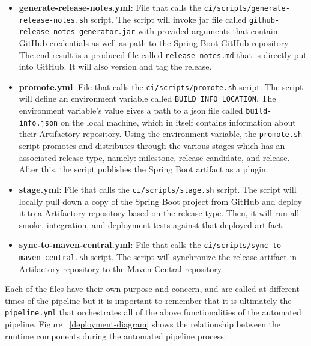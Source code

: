 \begin{itemize}
\item \textbf{generate-release-notes.yml}: File that calls the \texttt{ci/scripts/generate-release-notes.sh} script. The script will invoke jar file called \texttt{github-release-notes-generator.jar} with provided arguments that contain GitHub credentials as well as path to the Spring Boot GitHub repository. The end result is a produced file called \texttt{release-notes.md} that is directly put into GitHub. It will also version and tag the release.
\item \textbf{promote.yml}: File that calls the \texttt{ci/scripts/promote.sh} script. The script will define an environment variable called \texttt{BUILD\_INFO\_LOCATION}. The environment variable's value gives a path to a json file called \texttt{build-info.json} on the local machine, which in itself contains information about their Artifactory repository. Using the environment variable, the \texttt{promote.sh} script promotes and distributes through the various stages which has an associated release type, namely: milestone, release candidate, and release. After this, the script publishes the Spring Boot artifact as a plugin.
\item \textbf{stage.yml}: File that calls the \texttt{ci/scripts/stage.sh} script. The script will locally pull down a copy of the Spring Boot project from GitHub and deploy it to a Artifactory repository based on the release type. Then, it will run all smoke, integration, and deployment tests against that deployed artifact.
\item \textbf{sync-to-maven-central.yml}: File that calls the \texttt{ci/scripts/sync-to-maven-central.sh} script. The script will synchronize the release artifact in Artifactory repository to the Maven Central repository.
\end{itemize}

Each of the files have their own purpose and concern, and are called at different times of the pipeline but it is important to remember that it is ultimately the \texttt{pipeline.yml} that orchestrates all of the above functionalities of the automated pipeline. Figure ~\ref{deployment-diagram} shows the relationship between the runtime components during the automated pipeline process:

